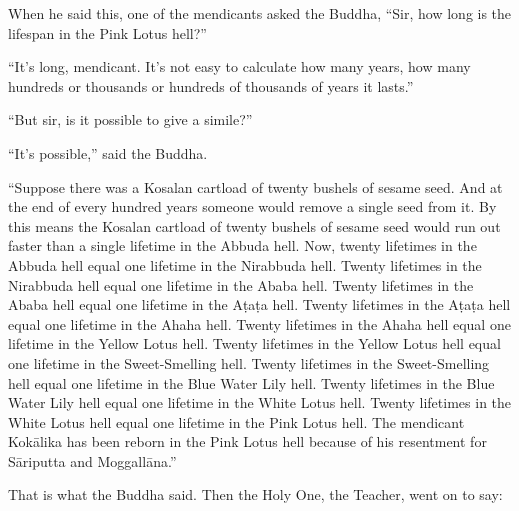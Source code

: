 \documentclass[12pt,openany]{book}%
\begin{document}
When he said this, one of the mendicants asked the Buddha, “Sir, how long is the lifespan in the Pink Lotus hell?” 

“It’s long, mendicant. It’s not easy to calculate how many years, how many hundreds or thousands or hundreds of thousands of years it lasts.” 

“But sir, is it possible to give a simile?” 

“It’s possible,” said the Buddha. 

“Suppose there was a Kosalan cartload of twenty bushels of sesame seed. And at the end of every hundred years someone would remove a single seed from it. By this means the Kosalan cartload of twenty bushels of sesame seed would run out faster than a single lifetime in the Abbuda hell. Now, twenty lifetimes in the Abbuda hell equal one lifetime in the Nirabbuda hell. Twenty lifetimes in the Nirabbuda hell equal one lifetime in the Ababa hell. Twenty lifetimes in the Ababa hell equal one lifetime in the \textsanskrit{Aṭaṭa} hell. Twenty lifetimes in the \textsanskrit{Aṭaṭa} hell equal one lifetime in the Ahaha hell. Twenty lifetimes in the Ahaha hell equal one lifetime in the Yellow Lotus hell. Twenty lifetimes in the Yellow Lotus hell equal one lifetime in the Sweet-Smelling hell. Twenty lifetimes in the Sweet-Smelling hell equal one lifetime in the Blue Water Lily hell. Twenty lifetimes in the Blue Water Lily hell equal one lifetime in the White Lotus hell. Twenty lifetimes in the White Lotus hell equal one lifetime in the Pink Lotus hell. The mendicant \textsanskrit{Kokālika} has been reborn in the Pink Lotus hell because of his resentment for \textsanskrit{Sāriputta} and \textsanskrit{Moggallāna}.” 

That is what the Buddha said. Then the Holy One, the Teacher, went on to say: 
\end{document}
